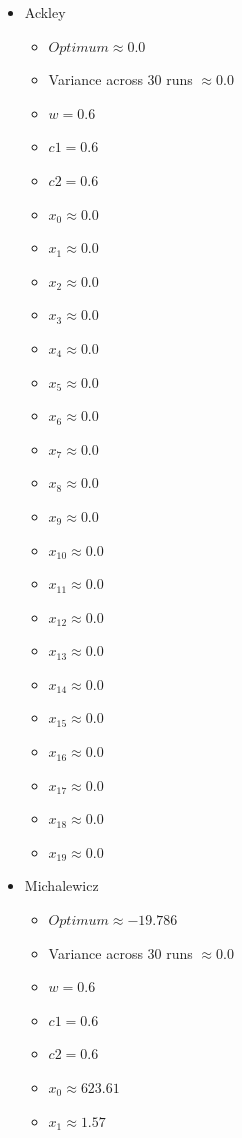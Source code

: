 \documentclass[hidelinks,english,conference]{IEEEtran}
\begin{document}
\begin{itemize}
\begin{itemize}
		\end{itemize}
	\item Ackley\\
		\begin{itemize}
			\item $Optimum \approx 0.0$
			\item Variance across 30 runs $ \approx 0.0$
			\item $w = 0.6$
			\item $c1 = 0.6$
			\item $c2 = 0.6$
			\item $x_{0} \approx 0.0$
			\item $x_{1} \approx 0.0$
			\item $x_{2} \approx 0.0$
			\item $x_{3} \approx 0.0$
			\item $x_{4} \approx 0.0$
			\item $x_{5} \approx 0.0$
			\item $x_{6} \approx 0.0$
			\item $x_{7} \approx 0.0$
			\item $x_{8} \approx 0.0$
			\item $x_{9} \approx 0.0$
			\item $x_{10} \approx 0.0$
			\item $x_{11} \approx 0.0$
			\item $x_{12} \approx 0.0$
			\item $x_{13} \approx 0.0$
			\item $x_{14} \approx 0.0$
			\item $x_{15} \approx 0.0$
			\item $x_{16} \approx 0.0$
			\item $x_{17} \approx 0.0$
			\item $x_{18} \approx 0.0$
			\item $x_{19} \approx 0.0$
		\end{itemize}
	\item Michalewicz\\
		\begin{itemize}
			\item $Optimum \approx -19.786$
			\item Variance across 30 runs $ \approx 0.0$
			\item $w = 0.6$
			\item $c1 = 0.6$
			\item $c2 = 0.6$
			\item $x_{0} \approx 623.61$
			\item $x_{1} \approx 1.57$

\end{itemize}
\end{itemize}
\end{document}
